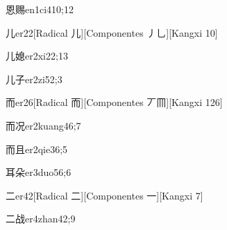 \begin{verbete}{恩赐}{en1ci4}{10;12}
\end{verbete}

\begin{verbete}{儿}{er2}{2}[Radical ⼉][Componentes ⼃乚][Kangxi 10]
\end{verbete}

\begin{verbete}{儿媳}{er2xi2}{2;13}
\end{verbete}

\begin{verbete}{儿子}{er2zi5}{2;3}
\end{verbete}

\begin{verbete}{而}{er2}{6}[Radical ⽽][Componentes 丆𦉫][Kangxi 126]
\end{verbete}

\begin{verbete}{而况}{er2kuang4}{6;7}
\end{verbete}

\begin{verbete}{而且}{er2qie3}{6;5}
\end{verbete}

\begin{verbete}{耳朵}{er3duo5}{6;6}
\end{verbete}

\begin{verbete}{二}{er4}{2}[Radical ⼆][Componentes ⼀][Kangxi 7]
\end{verbete}

\begin{verbete}{二战}{er4zhan4}{2;9}
\end{verbete}

